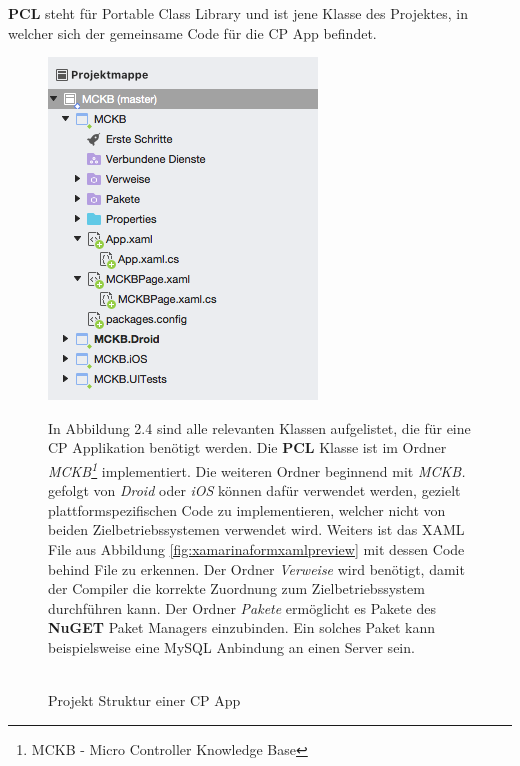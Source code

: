 	\newpage
	\textbf{PCL} steht für Portable Class Library und ist jene Klasse des Projektes, in welcher sich der gemeinsame Code für die CP App befindet.
	
	\begin{figure}[h!]
		\centering
		\begin{minipage}{.4\textwidth}
			\centering
			\includegraphics[width=.9\textwidth]{images/project-structure.png}
        	\label{fig:xamarinformprojectstructure}
			\caption[Projektstruktur einer CP App]{\\\hspace{\textwidth}Projekt Struktur einer CP App}
		\end{minipage}
		\begin{minipage}{.5\textwidth}
			In Abbildung 2.4 sind alle relevanten Klassen aufgelistet, die für eine CP Applikation benötigt werden. Die \textbf{PCL} Klasse ist im Ordner \textit{MCKB\footnote{MCKB - Micro Controller Knowledge Base}} implementiert. Die weiteren Ordner beginnend mit \textit{MCKB.} gefolgt von \textit{Droid} oder \textit{iOS} können dafür verwendet werden, gezielt plattformspezifischen Code zu implementieren, welcher nicht von beiden Zielbetriebssystemen verwendet wird. 
        	Weiters ist das XAML File aus Abbildung \ref{fig:xamarinaformxamlpreview} mit dessen Code behind File zu erkennen. Der Ordner \textit{Verweise} wird benötigt, damit der Compiler die korrekte Zuordnung zum Zielbetriebssystem durchführen kann. Der Ordner \textit{Pakete} ermöglicht es Pakete des \textbf{NuGET} Paket Managers einzubinden. Ein solches Paket kann beispielsweise eine MySQL Anbindung an einen Server sein.
        \end{minipage}
	\end{figure}
